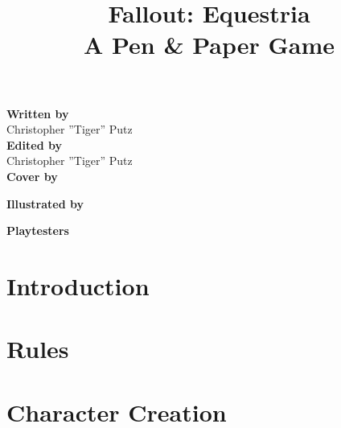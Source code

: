 \documentclass[12pt]{book}
\title{Fallout: Equestria\\
		\large A Pen \& Paper Game}
\begin{document}
\maketitle

\begin{center}
\textbf{\large Written by} \\ \normalsize
Christopher ''Tiger'' Putz \\

\vspace{14pt} \textbf{\large Edited by} \\ \normalsize
Christopher ''Tiger'' Putz \\

\vspace{14pt} \textbf{\large Cover by} \\ \normalsize

\vspace{14pt} \textbf{\large Illustrated by} \\ \normalsize

\vspace{14pt} \textbf{\large Playtesters} \\ \normalsize
 
\end{center}

\tableofcontents
  
\chapter{Introduction}
\begin{multicols}{2}

\end{multicols}

\chapter{Rules}
\begin{multicols}{2}

\end{multicols}

\chapter{Character Creation}
\begin{multicols}{2}

\end{multicols}
\end{document}
